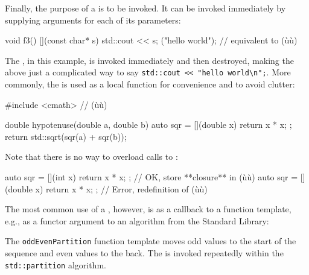 Finally, the purpose of a  is to be invoked. It can be
invoked immediately by supplying arguments for each of its parameters:

\begin{emcppslisting}
void f3()
{
    [](const char* s) { std::cout << s; }("hello world\n");
        // equivalent to (ù{}ù)
}
\end{emcppslisting}
    

The , in this example, is invoked immediately and
then destroyed, making the above just a complicated way to say
\lstinline!std::cout!~\lstinline!<<!~\lstinline!"hello!~\lstinline!world\n";!.
More commonly, the  is used as a local
function for convenience and to avoid clutter:

\begin{emcppslisting}
#include <cmath>  // (ù{}ù)

double hypotenuse(double a, double b)
{
    auto sqr = [](double x) { return x * x; };
    return std::sqrt(sqr(a) + sqr(b));
}
\end{emcppslisting}
    

Note that there is no way to overload calls to :

\begin{emcppslisting}
auto sqr = [](int x) { return x * x; };     // OK, store **closure** in (ù{}ù)
auto sqr = [](double x) { return x * x; };  // Error, redefinition of (ù{}ù)
\end{emcppslisting}
    

The most common use of a , however, is as a
callback to a function template, e.g., as a functor argument to an
algorithm from the Standard Library:

    

The \lstinline!oddEvenPartition! function template moves odd values to the
start of the sequence and even values to the back. The  is invoked repeatedly within the \lstinline!std::partition!
algorithm.

